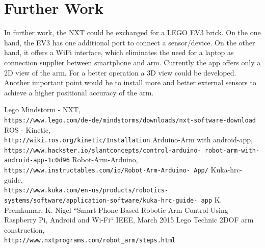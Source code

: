 \documentclass[conference]{IEEEtran}
\begin{document}
\section{Further Work}
In further work, the NXT could be exchanged for a LEGO EV3 brick. On the one hand, the EV3 has one additional port to connect a sensor/device. On the other hand, it offers a WiFi interface, which eliminates the need for a laptop as connection supplier between smartphone and arm.
Currently the app offers only a 2D view of the arm. For a better operation a 3D view could be developed.
Another important point would be to install more and better external sensors to achieve a higher positional accuracy of the arm.

\begin{thebibliography}{00}
Lego Mindstorm - NXT,
\\\texttt{https://www.lego.com/de-de/mindstorms/downloads/nxt-software-download}
ROS - Kinetic,
\\\texttt{http://wiki.ros.org/kinetic/Installation}
Arduino-Arm with android-app,
\\\texttt{https://www.hackster.io/slantconcepts/control-arduino-
	robot-arm-with-android-app-1c0d96}
Robot-Arm-Arduino,
\\\texttt{https://www.instructables.com/id/Robot-Arm-Arduino-
	App/}
Kuka-hrc-guide,
\\\texttt{https://www.kuka.com/en-us/products/robotics-
	systems/software/application-software/kuka-hrc-guide-
	app}
K. Premkumar, K. Nigel ``Smart Phone Based Robotic Arm Control Using
Raspberry Pi, Android and Wi-Fi`` IEEE, March 2015
Lego Technic 2DOF arm construction,
\\\texttt{http://www.nxtprograms.com/robot\_arm/steps.html}

\end{thebibliography}
\end{document}
